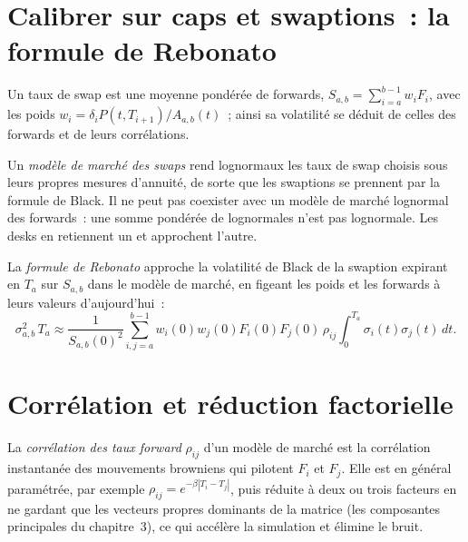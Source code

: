 \section{Calibrer sur caps et swaptions~: la formule de Rebonato}

Un taux de swap est une moyenne pondérée de forwards,
$S_{a,b}=\sum_{i=a}^{b-1}w_iF_i$, avec les poids $w_i = \delta_iP(t,T_{i+1})/A_{a,b}(t)$~; ainsi
sa volatilité se déduit de celles des forwards et de leurs corrélations.

\begin{definition}\label{def:rc:forward-rate-and-market-models:smm}
Un \emph{modèle de marché des swaps} rend lognormaux les taux de swap choisis
sous leurs propres mesures d'annuité, de sorte que les swaptions se prennent par
la formule de Black. Il ne peut pas coexister avec un modèle de marché lognormal des
forwards~: une somme pondérée de lognormales n'est pas lognormale. Les desks en retiennent un et
approchent l'autre.
\end{definition}

\begin{definition}\label{def:rc:forward-rate-and-market-models:rebonato}
La \emph{formule de Rebonato} approche la volatilité de Black
de la swaption expirant en $T_a$ sur $S_{a,b}$ dans le modèle de marché, en figeant les
poids et les forwards à leurs valeurs d'aujourd'hui~:
\[
\sigma_{a,b}^2\,T_a \approx \frac1{S_{a,b}(0)^2}\sum_{i,j=a}^{b-1}
w_i(0)w_j(0)F_i(0)F_j(0)\,\rho_{ij}\int_0^{T_a}\sigma_i(t)\sigma_j(t)\,dt .
\]
\end{definition}

\label{lst:rc:forward-rate-and-market-models:rebonato}

\section{Corrélation et réduction factorielle}

\begin{definition}\label{def:rc:forward-rate-and-market-models:corr}
La \emph{corrélation des taux forward} $\rho_{ij}$ d'un
modèle de marché est la corrélation instantanée des mouvements browniens qui pilotent
$F_i$ et $F_j$. Elle est en général paramétrée, par exemple
$\rho_{ij} = e^{-\beta|T_i-T_j|}$, puis réduite à deux ou trois facteurs en ne gardant que
les vecteurs propres dominants de la matrice (les composantes principales du
chapitre~3), ce qui accélère la simulation et élimine le bruit.
\end{definition}

